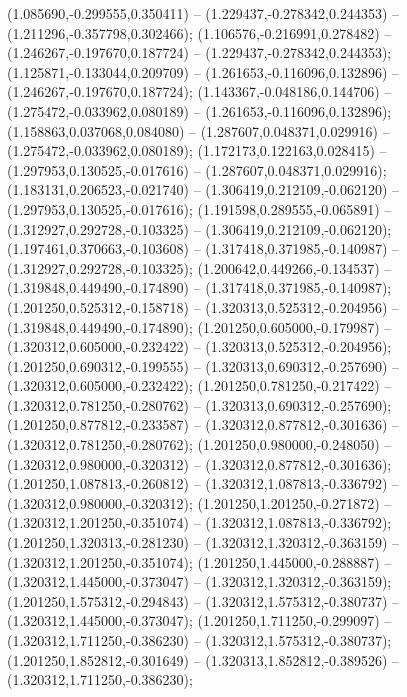  (1.085690,-0.299555,0.350411) -- (1.229437,-0.278342,0.244353) -- (1.211296,-0.357798,0.302466);
 (1.106576,-0.216991,0.278482) -- (1.246267,-0.197670,0.187724) -- (1.229437,-0.278342,0.244353);
 (1.125871,-0.133044,0.209709) -- (1.261653,-0.116096,0.132896) -- (1.246267,-0.197670,0.187724);
 (1.143367,-0.048186,0.144706) -- (1.275472,-0.033962,0.080189) -- (1.261653,-0.116096,0.132896);
 (1.158863,0.037068,0.084080) -- (1.287607,0.048371,0.029916) -- (1.275472,-0.033962,0.080189);
 (1.172173,0.122163,0.028415) -- (1.297953,0.130525,-0.017616) -- (1.287607,0.048371,0.029916);
 (1.183131,0.206523,-0.021740) -- (1.306419,0.212109,-0.062120) -- (1.297953,0.130525,-0.017616);
 (1.191598,0.289555,-0.065891) -- (1.312927,0.292728,-0.103325) -- (1.306419,0.212109,-0.062120);
 (1.197461,0.370663,-0.103608) -- (1.317418,0.371985,-0.140987) -- (1.312927,0.292728,-0.103325);
 (1.200642,0.449266,-0.134537) -- (1.319848,0.449490,-0.174890) -- (1.317418,0.371985,-0.140987);
 (1.201250,0.525312,-0.158718) -- (1.320313,0.525312,-0.204956) -- (1.319848,0.449490,-0.174890);
 (1.201250,0.605000,-0.179987) -- (1.320312,0.605000,-0.232422) -- (1.320313,0.525312,-0.204956);
 (1.201250,0.690312,-0.199555) -- (1.320313,0.690312,-0.257690) -- (1.320312,0.605000,-0.232422);
 (1.201250,0.781250,-0.217422) -- (1.320312,0.781250,-0.280762) -- (1.320313,0.690312,-0.257690);
 (1.201250,0.877812,-0.233587) -- (1.320312,0.877812,-0.301636) -- (1.320312,0.781250,-0.280762);
 (1.201250,0.980000,-0.248050) -- (1.320312,0.980000,-0.320312) -- (1.320312,0.877812,-0.301636);
 (1.201250,1.087813,-0.260812) -- (1.320312,1.087813,-0.336792) -- (1.320312,0.980000,-0.320312);
 (1.201250,1.201250,-0.271872) -- (1.320312,1.201250,-0.351074) -- (1.320312,1.087813,-0.336792);
 (1.201250,1.320313,-0.281230) -- (1.320312,1.320312,-0.363159) -- (1.320312,1.201250,-0.351074);
 (1.201250,1.445000,-0.288887) -- (1.320312,1.445000,-0.373047) -- (1.320312,1.320312,-0.363159);
 (1.201250,1.575312,-0.294843) -- (1.320312,1.575312,-0.380737) -- (1.320312,1.445000,-0.373047);
 (1.201250,1.711250,-0.299097) -- (1.320312,1.711250,-0.386230) -- (1.320312,1.575312,-0.380737);
 (1.201250,1.852812,-0.301649) -- (1.320313,1.852812,-0.389526) -- (1.320312,1.711250,-0.386230);
